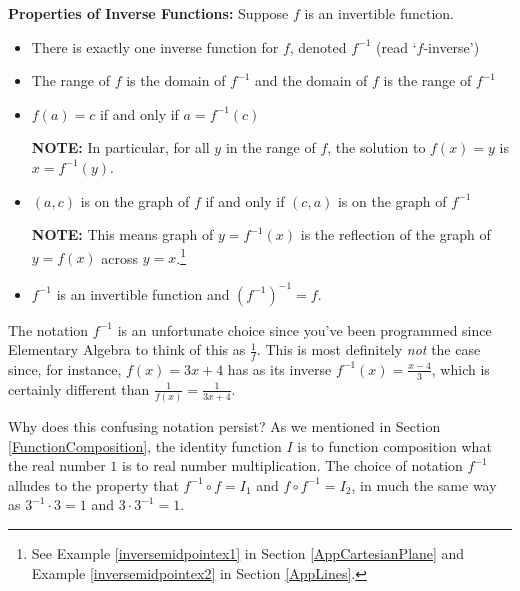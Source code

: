 \documentclass{ximera}
\begin{document}
\begin{theorem}\textbf{Properties of Inverse Functions:} \label{inversefunctionprops} Suppose $f$ is an invertible function.  

\begin{itemize}

\item  There is exactly one inverse function for $f$, denoted $f^{-1}$ (read `$f$-inverse')

\item  The range of $f$ is the domain of $f^{-1}$ and the domain of $f$ is the range of $f^{-1}$

\item  $f(a) = c$ if and only if $a = f^{-1}(c)$

\textbf{NOTE:}  In particular,  for all $y$ in the range of $f$, the solution to $f(x) = y$ is $x = f^{-1}(y)$.

\item  $(a,c)$ is on the graph of $f$ if and only if $(c,a)$ is on the graph of $f^{-1}$

\textbf{NOTE:}  This means graph of $y=f^{-1}(x)$ is the reflection of the graph of $y=f(x)$ across  $y=x$.\footnote{See Example \ref{inversemidpointex1} in Section \ref{AppCartesianPlane} and Example \ref{inversemidpointex2} in Section \ref{AppLines}.}

\item  $f^{-1}$ is an invertible function and $(f^{-1})^{-1} = f$.



\end{itemize}

\end{theorem}

The notation $f^{-1}$ is an unfortunate choice since you've been programmed since Elementary Algebra to think of this as $\frac{1}{f}$.  This is most definitely \textit{not} the case since, for instance, $f(x) = 3x+4$ has as its inverse $f^{-1}(x) = \frac{x-4}{3}$, which is certainly different than $\frac{1}{f(x)} = \frac{1}{3x+4}$.  

Why does this confusing notation persist?  As we mentioned in Section \ref{FunctionComposition}, the identity function $I$ is to function composition what the real number $1$ is to real number multiplication.  The choice of notation $f^{-1}$ alludes to the property that $f^{-1} \circ f = I_{1}$ and $f \circ f^{-1} = I_{2}$, in much the same way as $3^{-1} \cdot 3 = 1$ and $3 \cdot 3^{-1} = 1$.  
\end{document}
